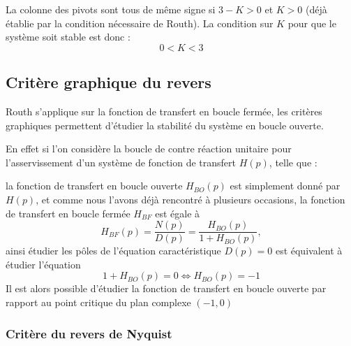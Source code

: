 La colonne des pivots sont tous de même signe si $3-K>0$ et $K>0$ (déjà établie par la condition nécessaire de Routh).
La condition sur $K$ pour que le système soit stable est donc :
$$
0<K<3
$$

\subsection{Critère graphique du revers}

Routh s'applique sur la fonction de transfert en boucle fermée, les critères graphiques permettent 
d'étudier la stabilité du système en boucle ouverte.

En effet si l'on considère la boucle de contre réaction unitaire pour l'asservissement d'un système
de fonction de transfert $H(p)$, telle que : 
\begin{center}
\end{center}

la fonction de transfert en boucle ouverte $H_{BO}(p)$ est simplement donné par $H(p)$, et comme nous l'avons 
déjà rencontré à plusieurs occasions, la fonction de transfert en boucle fermée $H_{BF}$ est égale à 
$$
H_{BF}(p)=\dfrac{N(p)}{D(p)}=\dfrac{H_{BO}(p)}{1+H_{BO}(p)},
$$
ainsi étudier les pôles de l'équation caractéristique $D(p)=0$ est équivalent à étudier l'équation 
$$
1+H_{BO}(p)=0\Leftrightarrow H_{BO}(p)=-1
$$
Il est alors possible d'étudier la fonction de transfert en boucle ouverte par rapport au point critique du plan complexe 
$(-1,0)$

\subsubsection{Critère du revers de Nyquist}

